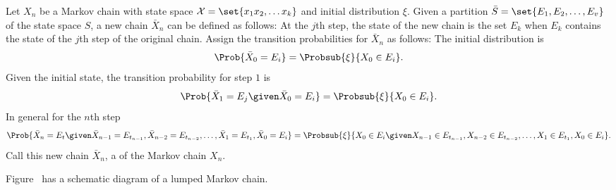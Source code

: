 \documentclass[12pt]{article}
\begin{document}

\begin{definition}
    Let \( X_n \) be a Markov chain with state space \( \mathcal{X} =
    \set{x_1 x_2, \dots x_k} \) and initial distribution \( \xi \).
    Given a partition \( \bar{S} = \set{E_1, E_2, \dots, E_v} \) of the
    state space \( S \), a new chain \( \bar{X}_n \) can be defined as
    follows:  At the \( j \)th step, the state of the new chain is the
    set \( E_k \) when \( E_k \) contains the state of the \( j \)th
    step of the original chain.  Assign the transition probabilities for
    \( \bar{X}_n \) as follows: The initial distribution is
    \[
        \Prob{\bar{X}_0 = E_i} = \Probsub{\xi}{X_0 \in E_i}.
    \] Given the initial state, the transition probability for step \( 1
    \) is
    \[
        \Prob{\bar{X}_1 = E_j \given \bar{X}_0 = E_i} = \Probsub{\xi}{X_0
        \in E_i }.
    \] In general for the \( n \)th step
    \[
        \Prob{\bar{X}_n = E_t \given \bar{X}_{n-1} = E_{t_{n-1}}, \bar{X}_
        {n-2} = E_{t_{n-2}}, \dots, \bar{X}_1 = E_{t_1}, \bar{X}_0 = E_i}
        = \Probsub{\xi}{X_0 \in E_i \given X_{n-1} \in E_{t_{n-1}}, X_{n-2}
        \in E_{t_{n-2}}, \dots, X_1 \in E_{t_1}, X_0 \in E_i}.
    \] Call this new chain \( \bar{X}_n \), a %
    of the Markov chain \( X_n \).
\end{definition}

Figure~\label{fig:lumpedchains:schematic} has a schematic diagram of a
lumped Markov chain.
\end{document}
